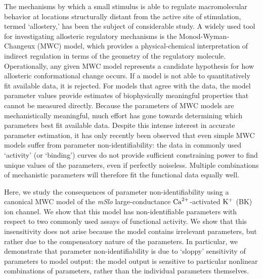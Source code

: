 \documentclass[10pt]{amsart}
\newcommand\ca{\rm{Ca}^{2+}}
\newcommand\kk{\rm{K}^+}
\begin{document}
The mechanisms by which a small stimulus is able to regulate macromolecular behavior at locations structurally distant from the active site of stimulation, termed `allostery,' has been the subject of considerable study.  A widely used tool for investigating allosteric regulatory mechanisms is the Monod-Wyman-Changeux (MWC) model, which provides a physical-chemical interpretation of indirect regulation in terms of the geometry of the regulatory molecule. Operationally, any given MWC model represents a candidate hypothesis for how allosteric conformational change occurs.  If a model is not able to quantitatively fit available data, it is rejected.  For models that agree with the data, the model parameter values provide estimates of biophysically meaningful properties that cannot be measured directly.  Because the parameters of MWC models are mechanistically meaningful, much effort has gone towards determining which parameters best fit available data.  Despite this intense interest in accurate parameter estimation, it has only recently been observed that even simple MWC models suffer from parameter non-identifiability: the data in commonly used `activity' (or `binding') curves do not provide sufficient constraining power to find unique values of the parameters, even if perfectly noiseless.  Multiple combinations of mechanistic parameters will therefore fit the functional data equally well.


Here, we study the consequences of parameter non-identifiability using a canonical MWC model of the {\it mSlo} large-conductance $\ca$-activated $\kk$ (BK) ion channel. We show that this model has non-identifiable parameters with respect to two commonly used assays of functional activity.  We show that this insensitivity does not arise because the model contains irrelevant parameters, but rather due to the compensatory nature of the parameters.  In particular, we demonstrate that parameter non-identifiability is due to `sloppy' sensitivity of parameters to model output: the model output is sensitive to particular nonlinear combinations of parameters, rather than the individual parameters themselves.%
\end{document}
